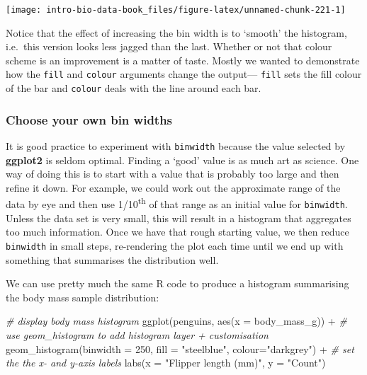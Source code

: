 \documentclass[
]{book}
\newenvironment{Shaded}{\begin{snugshade}}{\end{snugshade}}
\newcommand{\AttributeTok}[1]{\textcolor[rgb]{0.77,0.63,0.00}{#1}}
\newcommand{\CommentTok}[1]{\textcolor[rgb]{0.56,0.35,0.01}{\textit{#1}}}
\newcommand{\DecValTok}[1]{\textcolor[rgb]{0.00,0.00,0.81}{#1}}
\newcommand{\FunctionTok}[1]{\textcolor[rgb]{0.00,0.00,0.00}{#1}}
\newcommand{\NormalTok}[1]{#1}
\newcommand{\SpecialCharTok}[1]{\textcolor[rgb]{0.00,0.00,0.00}{#1}}
\newcommand{\StringTok}[1]{\textcolor[rgb]{0.31,0.60,0.02}{#1}}
\newenvironment{greybox}{
  \definecolor{shadecolor}{rgb}{0.95,0.95,0.95}  %
  \color{black}
  \begin{shaded}}
 {\end{shaded}}
\newenvironment{infobox}[1]
  {
  \begin{itemize}
  \renewcommand{\labelitemi}{
    \raisebox{-.7\height}[0pt][0pt]{
      {\setkeys{Gin}{width=3em,keepaspectratio}
        \texttt{[image: images/\#1]}}
    }
  }
  \setlength{\fboxsep}{1em}
  \begin{greybox}
  \item
  }
  {
  \end{greybox}
  \end{itemize}
  }
\begin{document}
\begin{center}\texttt{[image: intro-bio-data-book\_files/figure-latex/unnamed-chunk-221-1]} \end{center}

Notice that the effect of increasing the bin width is to `smooth' the histogram, i.e.~this version looks less jagged than the last. Whether or not that colour scheme is an improvement is a matter of taste. Mostly we wanted to demonstrate how the \texttt{fill} and \texttt{colour} arguments change the output--- \texttt{fill} sets the fill colour of the bar and \texttt{colour} deals with the line around each bar.

\begin{infobox}{warning}

\hypertarget{choose-your-own-bin-widths}{%
\subsubsection*{Choose your own bin widths}\label{choose-your-own-bin-widths}}

It is good practice to experiment with \texttt{binwidth} because the value selected by \textbf{ggplot2} is seldom optimal. Finding a `good' value is as much art as science. One way of doing this is to start with a value that is probably too large and then refine it down. For example, we could work out the approximate range of the data by eye and then use 1/10\textsuperscript{th} of that range as an initial value for \texttt{binwidth}. Unless the data set is very small, this will result in a histogram that aggregates too much information. Once we have that rough starting value, we then reduce \texttt{binwidth} in small steps, re-rendering the plot each time until we end up with something that summarises the distribution well.

\end{infobox}

We can use pretty much the same R code to produce a histogram summarising the body mass sample distribution:

\begin{Shaded}
\begin{Highlighting}[]
\CommentTok{\# display body mass histogram}
\FunctionTok{ggplot}\NormalTok{(penguins, }\FunctionTok{aes}\NormalTok{(}\AttributeTok{x =}\NormalTok{ body\_mass\_g)) }\SpecialCharTok{+} 
  \CommentTok{\# use geom\_histogram to add histogram layer + customisation}
  \FunctionTok{geom\_histogram}\NormalTok{(}\AttributeTok{binwidth =} \DecValTok{250}\NormalTok{, }\AttributeTok{fill =} \StringTok{"steelblue"}\NormalTok{, }\AttributeTok{colour=}\StringTok{"darkgrey"}\NormalTok{) }\SpecialCharTok{+}
  \CommentTok{\# set the the x{-} and y{-}axis labels}
  \FunctionTok{labs}\NormalTok{(}\AttributeTok{x =} \StringTok{"Flipper length (mm)"}\NormalTok{, }\AttributeTok{y =} \StringTok{"Count"}\NormalTok{)}
\end{Highlighting}
\end{Shaded}
\end{document}
